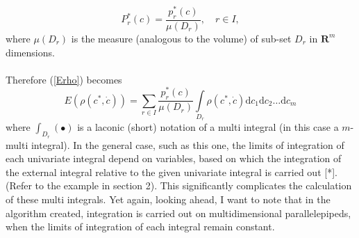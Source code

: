 \documentclass[11pt,a4paper]{article}
\numberwithin{equation}{subsection}
\begin{document}
\begin{equation}
P_{r}^{*}(c)=\frac{p_{r}^{*}(c)}{\mu(D_{r})}, \quad r \in I,
\end{equation}
where $\mu(D_{r})$ is the measure (analogous to the volume) of sub-set $D_{r}$ in $\boldsymbol{R}^{m}$ dimensions. \\
\\
Therefore (\ref{Erho}) becomes
\begin{equation}
E(\rho(c^{*},\dot{c}))=\sum\limits_{r \in I} \frac{p_{r}^{*}(c)}{\mu(D_{r})} \int\limits_{D_{r}}\rho(c^{*},\dot{c})\mathrm{d}c_{1}\mathrm{d}c_{2}\dots \mathrm{d}c_{m} \label{mathexpectancy}
\end{equation}
where $\int_ {D_{r}}(\bullet)$ is a laconic (short) notation of a multi integral (in this case a $m$-multi integral). In the general case, such as this one, the limits of integration of each univariate integral depend on variables, based on which the integration of the external integral relative to the given univariate integral is carried out [*]. (Refer to the example in section 2). This significantly complicates the calculation of these multi integrals. Yet again, looking ahead, I want to note that in the algorithm created, integration is carried out on multidimensional parallelepipeds, when the limits of integration of each integral remain constant. \\
\\
\end{document}
